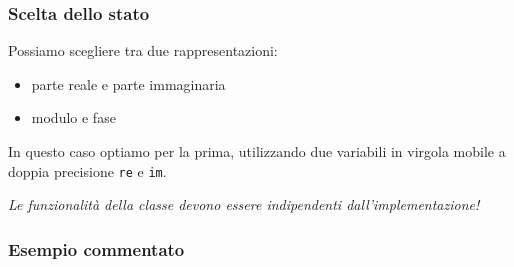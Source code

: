 \documentclass{article}
\begin{document}
\subsubsection{Scelta dello stato}
Possiamo scegliere tra due rappresentazioni:
\begin{itemize}
\item parte reale e parte immaginaria 
\item modulo e fase
\end{itemize}

In questo caso optiamo per la prima, utilizzando due variabili in virgola mobile a doppia precisione \texttt{re} e \texttt{im}.

\emph{Le funzionalità della classe devono essere indipendenti dall'implementazione!}

\subsubsection{Esempio commentato}
\end{document}
